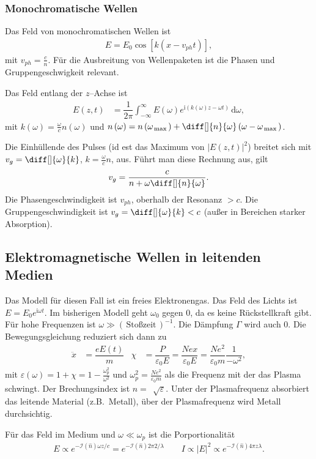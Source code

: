 \documentclass[a4paper,12pt]{article}
\newcommand{\td}{\,\text{d}}
\numberwithin{equation}{section}
\begin{document}
\subsubsection{Monochromatische Wellen}
Das Feld von monochromatischen Wellen ist
\begin{align} 
        E=E_0\cos \left[k\left(x-v_{ph}t\right)\right]
,\end{align} 
mit $v_{ph}=\tfrac{c}{n}$. Für die Ausbreitung von Wellenpaketen ist die Phasen und Gruppengeschwigkeit relevant.\par
Das Feld entlang der $z$--Achse ist 
\begin{align} 
        E\left(z,t\right)&=\dfrac{1}{2\pi }\int_{-\infty}^{\infty}E\left(\omega \right)e^{\text{i}\left(k\left(\omega \right)z-\omega t\right)}\td \omega 
,\end{align} 
mit $k\left(\omega \right)=\tfrac{\omega }{c}n\left(\omega \right)$ und $n\left(\omega \right)=n\left(\omega _{\,\text{max}\,}\right)+\diff[]{n}{\omega }\left(\omega -\omega _{\,\text{max}\,}\right)$.\par
Die Einhüllende des Pulses (id est das Maximum von $|E\left(z,t\right)|^2$) breitet sich mit $v_g=\diff[]{\omega }{k}$, $k=\tfrac{\omega }{c}n$, aus. Führt man diese Rechnung aus, gilt
\begin{align} 
        v_g=\dfrac{c}{n+\omega \diff[]{n}{\omega }}
.\end{align} 
Die Phasengeschwindigkeit ist $v_{ph}$, oberhalb der Resonanz $>c$. Die Gruppengeschwindigkeit ist $v_g=\diff[]{\omega }{k}<c$ (außer in Bereichen starker Absorption).

\subsection{Elektromagnetische Wellen in leitenden Medien}
Das Modell für diesen Fall ist ein freies Elektronengas. Das Feld des Lichts ist $E=E_0e^{\text{i}\omega t}$. Im bisherigen Modell geht $\omega _0$ gegen 0, da es keine Rückstellkraft gibt. Für hohe Frequenzen ist $\omega \gg \left(\,\text{Stoßzeit}\,\right)^{-1}$. Die Dämpfung $\Gamma $ wird auch 0. Die Bewegungsgleichung reduziert sich dann zu
\begin{align} 
        \ddot{x}&=\dfrac{eE\left(t\right)}{m}&\chi&=\dfrac{P}{\varepsilon _0E}=\dfrac{Nex}{\varepsilon _0E}=\dfrac{Ne^2}{\varepsilon _0m}\dfrac{1}{-\omega ^2}
,\end{align} 
mit $\varepsilon \left(\omega \right)=1+\chi=1-\tfrac{\omega _p^2}{\omega ^2}$ und $\omega _p^2=\tfrac{Ne^2}{\varepsilon _0m}$ als die Frequenz mit der das Plasma schwingt. Der Brechungsindex ist $n=\,\sqrt[]{\varepsilon }$. Unter der Plasmafrequenz absorbiert das leitende Material (z.B.\ Metall), über der Plasmafrequenz wird Metall durchsichtig.\par
Für das Feld im Medium und $\omega \ll \omega _p$ ist die Porportionalität 
\begin{align} 
        E\propto e^{- \mathcal{I}\left(\hat{n}\right)\omega z/c}=e^{-\mathcal{I}\left(\hat{n}\right)2\pi 2/\lambda }\qquad I\propto |E|^2\propto e^{-\mathcal{I}\left(\hat{n}\right)4\pi z\lambda }
.\end{align} 
\end{document}
